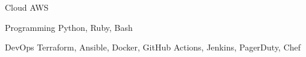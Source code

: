 


\begin{cvskills}


\cvskill
{Cloud} %
{AWS} %


\cvskill
{Programming} %
{Python, Ruby, Bash} %


\cvskill
{DevOps} %
{Terraform, Ansible, Docker, GitHub Actions, Jenkins, PagerDuty, Chef} %


\end{cvskills}

